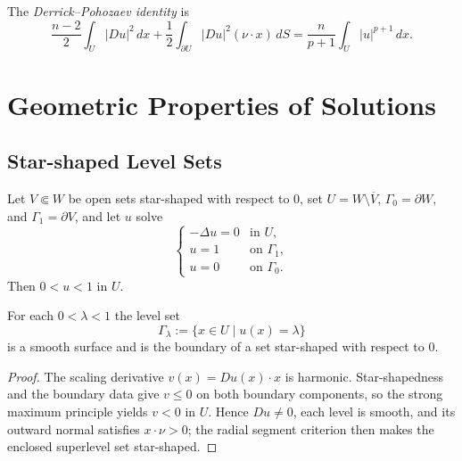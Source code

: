 \begin{remark}
\label{rem:derrick-pohozaev-identity-name}

The \textit{Derrick--Pohozaev identity} is
\[
\frac{n-2}{2}\int_U|Du|^2\,dx
+\frac12\int_{\partial U}|Du|^2(\nu\cdot x)\,dS
=\frac{n}{p+1}\int_U|u|^{p+1}\,dx.
\tag{18}
\]
\end{remark}

\section{Geometric Properties of Solutions}
\label{sec:geometric-properties-of-solutions}

\subsection{Star-shaped Level Sets}
\label{sec:star-shaped-level-sets}

Let $V\Subset W$ be open sets star-shaped with respect to $0$, set
$U=W\setminus\overline V$, $\Gamma_0=\partial W$, and $\Gamma_1=\partial V$, and let $u$ solve
\[
\begin{cases}
-\Delta u=0 & \text{in }U,\\
u=1 & \text{on }\Gamma_1,\\
u=0 & \text{on }\Gamma_0.
\end{cases}
\tag{1}
\]
Then $0<u<1$ in $U$.

\begin{theorem}
\label{thm:star-shaped-level-sets}

For each $0 < \lambda < 1$ the level set
\[
\Gamma_\lambda := \{x \in U \mid u(x) = \lambda\}
\]
is a smooth surface and is the boundary of a set star-shaped with respect to $0$.
\end{theorem}

\begin{proof}
\sketch The scaling derivative $v(x)=Du(x)\cdot x$ is harmonic. Star-shapedness and the boundary data give $v\leq0$ on both boundary components, so the strong maximum principle yields $v<0$ in $U$. Hence $Du\neq0$, each level is smooth, and its outward normal satisfies $x\cdot\nu>0$; the radial segment criterion then makes the enclosed superlevel set star-shaped.
\end{proof}

